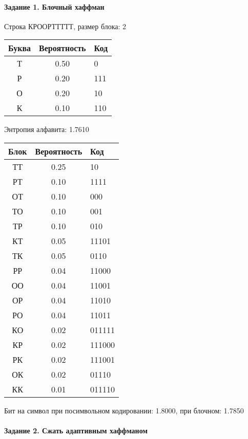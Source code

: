 \documentclass[a4paper, 12pt]{article}
\begin{document}
\paragraph{Задание 1. Блочный хаффман \\}

Строка КРООРТТТТТ, размер блока: 2
\begin{center}
 \begin{tabular}{ |c|c|l| } 
  \hline
     Буква & Вероятность & Код\\ \hline
Т & 0.50 & 0\\\hline
Р & 0.20 & 111\\\hline
О & 0.20 & 10\\\hline
К & 0.10 & 110
\\ \hline \end{tabular}
\end{center}
Энтропия алфавита: 1.7610
\begin{center}
 \begin{tabular}{ |c|c|l| } 
  \hline
     Блок & Вероятность & Код\\ \hline
ТТ & 0.25 & 10\\\hline
РТ & 0.10 & 1111\\\hline
ОТ & 0.10 & 000\\\hline
ТО & 0.10 & 001\\\hline
ТР & 0.10 & 010\\\hline
КТ & 0.05 & 11101\\\hline
ТК & 0.05 & 0110\\\hline
РР & 0.04 & 11000\\\hline
ОО & 0.04 & 11001\\\hline
ОР & 0.04 & 11010\\\hline
РО & 0.04 & 11011\\\hline
КО & 0.02 & 011111\\\hline
КР & 0.02 & 111000\\\hline
РК & 0.02 & 111001\\\hline
ОК & 0.02 & 01110\\\hline
КК & 0.01 & 011110
\\ \hline \end{tabular}
\end{center}
Бит на символ при посимвольном кодировании: 1.8000, при блочном: 1.7850


\pagebreak
\paragraph{Задание 2. Сжать адаптивным хаффманом\\}
\end{document}
